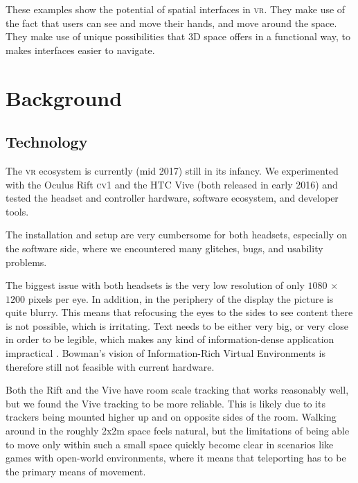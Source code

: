 \documentclass[nobib]{tufte-book} %
\begin{document}
These examples show the potential of spatial interfaces in \textsc{vr}. They make use of the fact that users can see and move their hands, and move around the space. They make use of unique possibilities that 3D space offers in a functional way, to makes interfaces easier to navigate.


\chapter{Background}
\label{ch:background}

\section{Technology}
The \textsc{vr} ecosystem is currently (mid 2017) still in its infancy. We experimented with the Oculus Rift \textsc{cv1} and the \textsc{HTC} Vive (both released in early 2016) and tested the headset and controller hardware, software ecosystem, and developer tools.

The installation and setup are very cumbersome for both headsets, especially on the software side, where we encountered many glitches, bugs, and usability problems.

The biggest issue with both headsets is the very low resolution of only $1080$ $\times$ $1200$ pixels per eye. In addition, in the periphery of the display the picture is quite blurry. This means that refocusing the eyes to the sides to see content there is not possible, which is irritating. Text needs to be either very big, or very close in order to be legible, which makes any kind of information-dense application impractical \cite{elliott2015virtual}. Bowman's vision of Information-Rich Virtual Environments \cite{bowman2003information} is therefore still not feasible with current hardware.

Both the Rift and the Vive have room scale tracking that works reasonably well, but we found the Vive tracking to be more reliable. This is likely due to its trackers being mounted higher up and on opposite sides of the room. Walking around in the roughly 2x2m space feels natural, but the limitations of being able to move only within such a small space quickly become clear in scenarios like games with open-world environments, where it means that teleporting has to be the primary means of movement.
\end{document}
